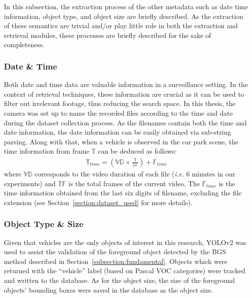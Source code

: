 In this subsection, the extraction process of the other metadata such as date time information, object type, and object size are briefly described. As the extraction of these semantics are trivial and/or play little role in both the extraction and retrieval modules, these processes are briefly described for the sake of completeness.

\vspace{1em}
\subsubsection{Date \& Time}

Both date and time data are valuable information in a surveillance setting. In the context of retrieval techniques, these information are crucial as it can be used to filter out irrelevant footage, thus reducing the search space. In this thesis, the camera was set up to name the recorded files according to the time and date during the dataset collection process. As the filenames contain both the time and date information, the date information can be easily obtained via sub-string parsing. Along with that, when a vehicle is observed in the car park scene, the time information from frame $\mathbb{T}$ can be deduced as follows:
\begin{align}
\label{eq:timecount}
    \mathbb{T}_{time}  = (\mathbb{VD} \times \frac{\mathbb{T}}{\mathbb{TF}}) + \mathbb{F}_{time}
\end{align}
where $\mathbb{VD}$ corresponds to the video duration of each file (\emph{i.e.} 6 minutes in our experiments) and $\mathbb{TF}$ is the total frames of the current video. The $\mathbb{F}_{time}$ is the time information obtained from the last six digits of filename, excluding the file extension (see Section~\ref{section:dataset_used} for more details). 


\vspace{1em}
\subsubsection{Object Type \& Size}
\label{objecttype}
Given that vehicles are the only objects of interest in this research, YOLOv2 was used to assist the validation of the foreground object detected by the BGS method described in Section~\ref{subsection:fundamental}. Objects which were returned with the ``vehicle'' label (based on Pascal VOC categories) were tracked and written to the database. As for the object size, the size of the foreground objects' bounding boxes were saved in the database as the object size.


